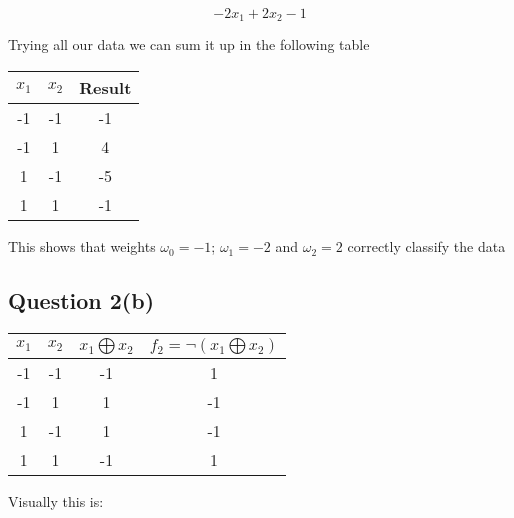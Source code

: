 \documentclass[10pt,a4paper]{article}
\begin{document}
\begin{equation}
-2x_1 + 2x_2 - 1
\end{equation}

Trying all our data we can sum it up in the following table

\begin{tabular}{|c|c|c|}
\hline
$x_1$ & $x_2$ & Result \\
\hline
-1 &-1 & -1\\
-1 & 1 & 4\\
1  &-1 & -5\\
1  & 1 & -1 \\
\hline
\end{tabular}

This shows that weights $\omega_0 = -1$; $\omega_1 = -2$ and $\omega_2 = 2$ correctly classify the data




















\subsection{Question 2(b)}

\begin{tabular}{|c|c|c|c|}
\hline
$x_1$ & $x_2$ & $x_1 \bigoplus x_2$ & $f_2 =\neg (x_1 \bigoplus x_2)$ \\
\hline
-1 &-1 &-1 &1\\
-1 &1 &1 &-1\\
1 &-1 &1 &-1\\
1 &1 &-1 &1\\
\hline
\end{tabular}

Visually this is:

\begin{center}
\end{center}
\end{document}
